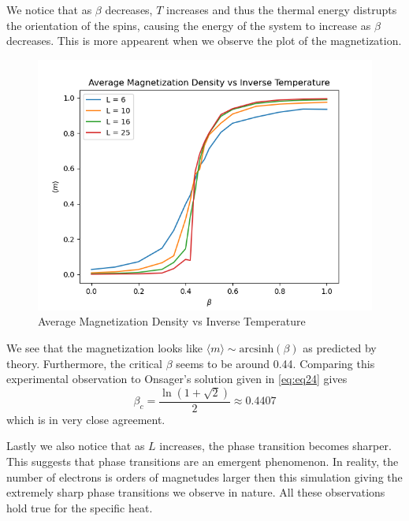 \documentclass{article}
\begin{document}
We notice that as $\beta$ decreases, $T$ increases and thus the thermal energy distrupts the orientation of the spins, causing
the energy of the system to increase as $\beta$ decreases. This is more appearent when we observe the plot of the magnetization.

\begin{figure}[ht]
    \includegraphics[width=\columnwidth]{plots/avg_mag_vs_beta.png}
    \caption{Average Magnetization Density vs Inverse Temperature}
    \label{fig:4}
\end{figure}

We see that the magnetization looks like $\langle m \rangle \sim \mathrm{arcsinh}(\beta)$ as predicted by theory. 
Furthermore, the critical $\beta$ seems to be around 0.44. Comparing this experimental observation to Onsager's solution given 
in \eqref{eq:eq24} gives 
\begin{equation}
    \beta_c = \frac{\ln(1+\sqrt{2})}{2} \approx 0.4407
\end{equation}
which is in very close agreement. 

Lastly we also notice that as $L$ increases, the phase transition becomes sharper. This suggests that phase transitions are
an emergent phenomenon. In reality, the number of electrons is orders of magnetudes larger then this simulation giving the extremely sharp 
phase transitions we observe in nature. All these observations hold true for the specific heat.
\end{document}
